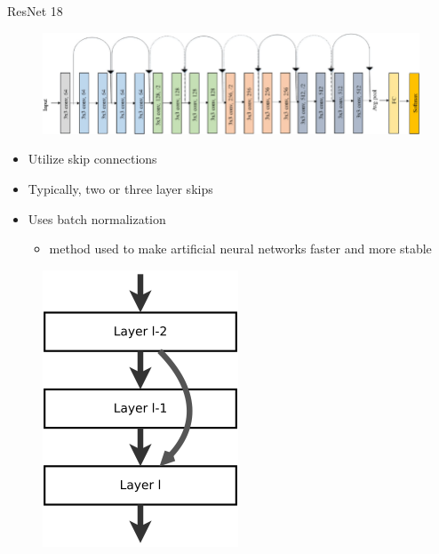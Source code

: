 \documentclass{beamer}
\begin{document}
\begin{frame}{ResNet 18}

\begin{figure}
    \centering
    \includegraphics[scale=0.4]{images/resnet18image.png}
\end{figure}


\noindent\begin{minipage}{0.6\textwidth}%
\begin{itemize}
    \item Utilize skip connections
    \item Typically, two or three layer skips
    \item Uses batch normalization
    \begin{itemize}
        \item[\ding{43}] method used to make artificial neural networks faster and more stable
    \end{itemize}
\end{itemize}

\end{minipage}%
\hfill%
\begin{minipage}{0.3\textwidth}\raggedleft
\begin{figure}
    \centering
    \includegraphics[scale=0.3]{ResNet_canonicalform.png}
\end{figure}
\end{minipage}


    
\end{frame}
\end{document}
